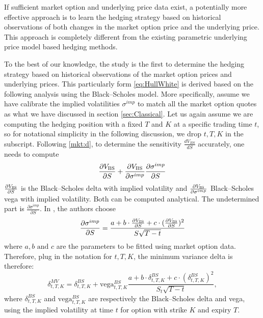 \documentclass[letterpaper,12pt,titlepage,oneside,final]{book}
\numberwithin{equation}{section}
\theoremstyle{definition}
\newcommand{\BS}{\textsc{BS}}
\newcommand{\MV}{\bf \textsc{MV}}
\begin{document}
If sufficient market option and underlying price data exist, a potentially more effective approach is to learn the hedging strategy 
based on historical observations of both  changes in the market option price and the underlying price. This approach is completely different from the existing  parametric underlying price
model based hedging methods.

To the best of our knowledge, the study
\cite{hulloptimal} is the first to determine the hedging strategy based on historical observations of the market option prices and 
underlying prices.  
This particularly form \eqref{eq:HullWhite} is derived based on the following analysis using the Black–Scholes model. 
More specifically, assume we have calibrate the implied volatilities $\sigma^{imp}$ to match all the market option quotes as what we have discussed in section \ref{sec:Classical}.
Let us again assume we  are computing  the hedging position  with a fixed $T$ and $K$ at a specific trading time $t$, so for notational simplicity in the following discussion, we drop ${t,T,K}$ in the subscript. Following \eqref{mkt:d}, to determine the  sensitivity  $\frac{d V_{BS}}{d S} $ accurately, one needs to compute 
\begin{equation} \label{eq:Chain}
\frac{\partial V_\BS}{\partial S} + \frac{\partial V_\BS}{\partial \sigma^{imp}}
\frac{\partial \sigma^{imp}}{\partial S}
\end{equation}
$
\frac{\partial V_\BS}{\partial S}
$ is the Black–Scholes delta with implied volatility and $\frac{\partial V_\BS}{\partial \sigma^{imp}}$ Black–Scholes vega with implied volatility. Both can be computed analytical. The undetermined part is $\frac{\partial \sigma^{imp}}{\partial S}$.
In \cite{hulloptimal}, the authors choose  
$$
\frac{\partial \sigma^{imp}}{\partial S} =
\frac{a+b \cdot\frac{\partial V_\BS}{\partial S}+c \cdot (\frac{\partial V_\BS}{\partial S})^2}{S \sqrt{T-t}}
$$
where $a, b \text{ and  } c$ are the parameters to be fitted using  market option data. Therefore, plug in the notation for $t,T,K$,
the minimum variance delta is therefore:
\begin{equation}
\delta^{MV}_{t,T,K}=\delta^{BS}_{t,T,K}+\text{vega}^{BS}_{t,T,K} \frac{a+b \cdot \delta^{BS}_{t,T,K} +c \cdot (\delta^{BS}_{t,T,K})^2}{S_t\sqrt{T-t}},
\label{eq:HullWhite}
\end{equation}
where $\delta^{BS}_{t,T,K}$ and $\text{vega}^{BS}_{t,T,K}$ are respectively the Black–Scholes delta and vega, using the implied volatility at time $t$ for option with strike $K$ and expiry $T$.
\end{document}
